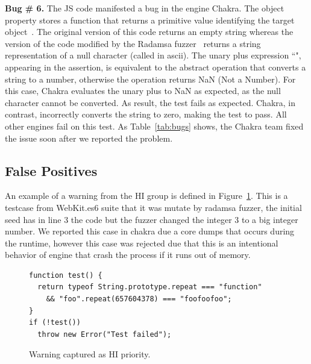 \documentclass[10pt,conference,anonymous]{IEEEtran}
\begin{document}
 

\vspace{1ex}\noindent\textbf{Bug \# 6.} The JS code  
manifested a bug in the \js{} engine Chakra.  The object
property  stores a function that returns a primitive
value identifying the target object~\cite{valueof}. The original
version of this code returns an empty string whereas the version of
the code modified by the Radamsa fuzzer~\cite{radamsa} returns a string
representation of a null character (called  in ascii). The
unary plus expression ``", appearing in the assertion, is
equivalent to the abstract operation 
that converts a string to a number, otherwise the operation returns
NaN (Not a Number)\cite{unary-plus}. For this case, Chakra evaluates
the unary plus to NaN as expected, as the null character cannot be
converted. As result, the test fails as expected. Chakra, in contrast,
incorrectly converts the string to zero, making the test to pass. All
other engines fail on this test. As Table~\ref{tab:bugs} shows, the
Chakra team fixed the issue soon after we reported the problem.

\subsection{False Positives}

An example of a warning from the HI group is defined in Figure~\ref{fig:hi-priority}. 
This is a testcase from WebKit.es6 suite that it was mutate by radamsa fuzzer, the 
initial seed has in line 3 the code  but the fuzzer changed the 
integer 3 to a big integer number. We reported this case in chakra due a core dumps that occurs
during the runtime, however this case was rejected due  that
this is an intentional behavior of engine that crash the process if it runs out of memory.

\begin{figure}[h!]
  \centering
  \scriptsize
  \begin{lstlisting}
function test() {
  return typeof String.prototype.repeat === "function"
    && "foo".repeat(657604378) === "foofoofoo";
}
if (!test())
  throw new Error("Test failed");
  \end{lstlisting}
  \normalsize
  \caption{Warning captured as HI priority.}
  \label{fig:hi-priority}
  \end{figure}
\end{document}
